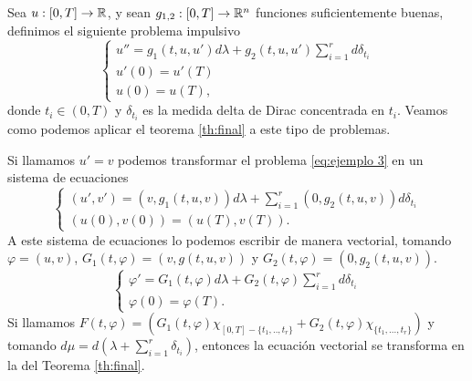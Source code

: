  \begin{example}\label{ejemplo vectorial}
 	Sea $u:[0,T]\to \mathbb{R}$, y sean $g_{1,2}:[0,T]\to \mathbb{R}^n$  funciones suficientemente buenas, definimos el siguiente problema impulsivo
 	 \begin{equation}\label{eq:ejemplo 3}
 		\left\lbrace \begin{array}{l}
    u''=g_1(t,u,u')d\lambda+g_2(t,u,u') \displaystyle\sum_{i=1}^rd\delta_{t_i}\\
 			u'(0)=u'(T)\\
 			u(0)=u(T),
 		\end{array}\right. 
 	\end{equation} 
 donde $t_i\in(0,T)$ y $\delta_{t_i}$ es la medida delta de Dirac concentrada en $t_i$. Veamos como podemos aplicar el teorema \ref{th:final} a este tipo de problemas.
 
 Si llamamos $u'=v$  podemos transformar el problema \eqref{eq:ejemplo 3} en un sistema de ecuaciones
  \begin{equation*}
 	\left\lbrace \begin{array}{l}
 		(u',v')=\left(v, g_1(t,u,v)\right)d\lambda +\displaystyle\sum_{i=1}^r\left(0,g_2(t,u,v)\right)d \delta_{t_i}\\
   (u(0),v(0))=(u(T),v(T)).
 	\end{array}\right. 
 \end{equation*} 
A este sistema de ecuaciones lo podemos escribir de manera vectorial, tomando $\varphi=(u,v)$, $G_1(t,\varphi)=(v,g(t,u,v))$ y $G_2(t,\varphi)=(0,g_2(t,u,v))$.
  \begin{equation*}
	\left\lbrace \begin{array}{l}
	\varphi'=G_1(t,\varphi)d\lambda+G_2(t,\varphi)\displaystyle\sum_{i=1}^r d \delta_{t_i}\\
 \varphi(0)=\varphi(T).
	\end{array}\right. 
\end{equation*} 
Si llamamos $F(t,\varphi)=\left( G_1(t,\varphi)\chi_{[0,T]-\{t_1,..,t_r\}}+G_2(t,\varphi)\chi_{\{t_1,...,t_r\}}\right) $ y tomando $d\mu=d\left(\lambda+\displaystyle\sum_{i=1}^r\delta_{t_i}\right)$, entonces la ecuación vectorial se transforma en la del Teorema \ref{th:final}. 
 
 \end{example}
 
